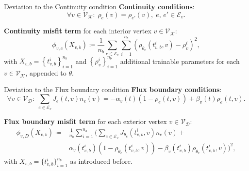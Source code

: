 \documentclass[9pt]{beamer}
\begin{document}
\begin{frame}{Deviation to the Continuity condition}
    \textbf{Continuity conditions}:
    \begin{equation*}
        \forall v \in \mathcal{V}_\mathcal{K} \colon \; \rho_e \left( v \right)  = \rho_{e'} \left( v \right), \; e,\,e' \in \mathcal{E}_v.
    \end{equation*}

    \vspace{3mm}

    \textbf{Continuity misfit term} for each interior vertex $v \in \mathcal{V}_{\mathcal{K}}$:
    \begin{equation*} 
        \phi_{v,c}  \left( X_{v,b} \right) \coloneqq \frac{1}{n_b} \sum_{e \in \mathcal{E}_v} \sum_{i=1}^{n_b} \left(  \rho_{\theta_e}  \left( t_{v,b}^i, v \right) - \rho_{v}^i \right)^2,
    \end{equation*} 
    with $X_{v,b} = \left\{ t_{v,b}^i \right\}_{i=1}^{n_b}$ and $\left\{ \rho_{v}^i \right\}_{i=1}^{n_b}$ additional trainable parameters for each $v \in \mathcal{V}_{\mathcal{K}}$, appended to $\theta$.
\end{frame}



\begin{frame}{Deviation to the Flux boundary condition}
    \textbf{Flux boundary conditions}:
    \begin{equation*}
        \forall v \in \mathcal{V}_\mathcal{D} \colon \; \sum_{e\in \mathcal{E}_v}J_e \left( t, v \right)  n_e  \left( v \right) =-\alpha_v \left( t \right)   \left( 1-\rho_e \left(t, v \right) \right)  + \beta_v \left( t \right)  \rho_e \left(t, v \right).
    \end{equation*}

    \vspace{3mm}

    \textbf{Flux boundary misfit term} for each exterior vertex $v \in \mathcal{V}_{\mathcal{D}}$:
    \begin{equation*}
        \begin{aligned} 
            \phi_{v,D}  \left( X_{v,b} \right) \coloneqq & \frac{1}{n_b} \sum_{i=1}^{n_b} \bigg( \sum_{e \in \mathcal{E}_v} J_{\theta_e}\left( t_{v,b}^i, v \right) n_e  \left( v \right) + \\
            & \alpha_v \left( t_{v,b}^i \right)  \left( 1- \rho_{\theta_e}  \left( t_{v,b}^i, v \right) \right) - \beta_v \left( t_{v,b}^i \right) \rho_{\theta_e}  \left( t_{v,b}^i, v \right) \bigg)^2,
        \end{aligned}
    \end{equation*}
    with $X_{v,b} = \{t_{v,b}^i\}_{i=1}^{n_b}$ as introduced before.
\end{frame}
\end{document}

